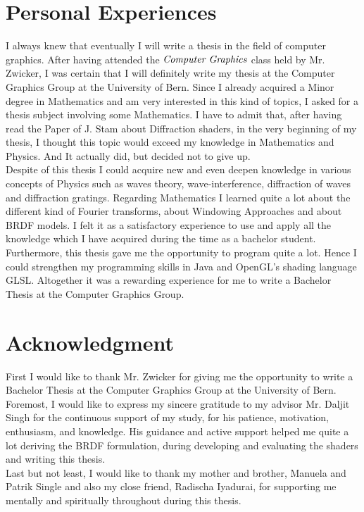 \section{Personal Experiences}
I always knew that eventually I will write a thesis in the field of computer graphics. After having attended the $\emph{Computer Graphics}$ class held by Mr. Zwicker, I was certain that I will definitely write my thesis at the Computer Graphics Group at the University of Bern. Since I already acquired a Minor degree in Mathematics and am very interested in this kind of topics, I asked for a thesis subject involving some Mathematics. I have to admit that, after having read the Paper of J. Stam about Diffraction shaders, in the very beginning of my thesis, I thought this topic would exceed my knowledge in Mathematics and Physics. And It actually did, but decided not to give up. \\

Despite of this thesis I could acquire new and even deepen knowledge in various concepts of Physics such as waves theory, wave-interference, diffraction of waves and diffraction gratings. Regarding Mathematics I learned quite a lot about the different kind of Fourier transforms, about Windowing Approaches and about BRDF models. I felt it as a satisfactory experience to use and apply all the knowledge which I have acquired during the time as a bachelor student. Furthermore, this thesis gave me the opportunity to program quite a lot. Hence I could strengthen my programming skills in Java and OpenGL's shading language GLSL. Altogether it was a rewarding experience for me to write a Bachelor Thesis at the Computer Graphics Group.

\section{Acknowledgment}
First I would like to thank Mr. Zwicker for giving me the opportunity to write a Bachelor Thesis at the Computer Graphics Group at the University of Bern. \\

Foremost, I would like to express my sincere gratitude to my advisor Mr. Daljit Singh for the continuous support of my study, for his patience, motivation, enthusiasm, and knowledge. His guidance and active support helped me quite a lot deriving the BRDF formulation, during developing and evaluating the shaders and writing this thesis. \\
  
Last but not least, I would like to thank my mother and brother, Manuela and Patrik Single and also my close friend, Radischa Iyadurai, for supporting me mentally and spiritually throughout during this thesis.
